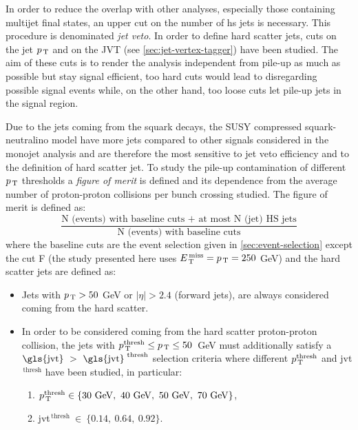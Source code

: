 In order to reduce the overlap with other analyses, especially those containing
multijet final states, an upper cut on the number of \gls{hs} jets is
necessary. This procedure is denominated \emph{jet veto}. In order to define
hard scatter jets, cuts on the jet $p_\mathrm{\, T}$ and on the JVT (see
\cref{sec:jet-vertex-tagger}) have been studied. The aim of these cuts is to
render the analysis independent from pile-up as much as possible but stay
signal efficient, too hard cuts would lead to disregarding possible signal
events while, on the other hand, too loose cuts let pile-up jets in the signal
region.

Due to the jets coming from the squark decays, the SUSY compressed
squark-neutralino model have more jets compared to other signals considered in
the monojet analysis and are therefore the most sensitive to jet veto efficiency
and to the definition of hard scatter jet. To study the pile-up contamination
of different $p_\mathrm{\, T}$ thresholds a \emph{figure of merit} is defined and its
dependence from the average number of proton-proton collisions per bunch
crossing studied. The figure of merit is defined as:
\begin{equation}
  \label{eq:fig_merit}
  \frac{\text{N (events) with baseline cuts + at
      most N (jet) HS jets}}{\text{N (events)
      with baseline cuts}}
\end{equation}
where the baseline cuts are the event selection given in
\cref{sec:event-selection} except the cut F (the study presented here uses
$E_\mathrm{\, T}^\mathrm{\, miss} = p_\mathrm{\, T} = 250$ GeV) and the hard scatter jets are defined as:
\begin{itemize}
\item Jets with $p_\mathrm{\, T} > 50$ GeV or $|\eta| > 2.4$ (forward jets), are always
  considered coming from the hard scatter.
\item In order to be considered coming from the hard scatter proton-proton
  collision, the jets with $p_\mathrm{\, T}^{\mathrm{thresh}} \leq p_\mathrm{\, T} \leq 50$~GeV must
  additionally satisfy a
  $\mathrm{\gls{jvt}}~>~\mathrm{\gls{jvt}}^{\text{ thresh}}$ selection criteria
  where different $p_\mathrm{\, T}^{\mathrm{thresh}}$ and \gls{jvt}$^{\mathrm{\, thresh}}$
  have been studied, in particular:
  \begin{enumerate}[A -]
  \item
    $p_\mathrm{\, T}^{\mathrm{thresh}} \in
    \{30~\mathrm{GeV},~40~\mathrm{GeV},~50~\mathrm{GeV}, ~70~\mathrm{GeV}\}$,
  \item \gls{jvt}$^{\mathrm{\, thresh}}~\in~ \{0.14,~0.64,~0.92\}$.
  \end{enumerate}
\end{itemize}

